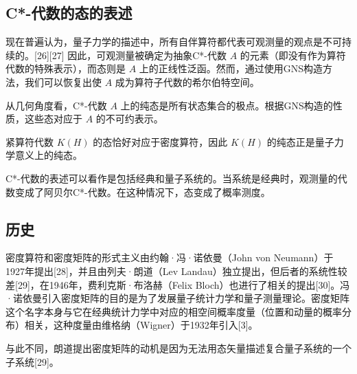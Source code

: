 \subsection{C*-代数的态的表述}
现在普遍认为，量子力学的描述中，所有自伴算符都代表可观测量的观点是不可持续的。[26][27] 因此，可观测量被确定为抽象C*-代数 \( A \) 的元素（即没有作为算符代数的特殊表示），而态则是 \( A \) 上的正线性泛函。然而，通过使用GNS构造方法，我们可以恢复出使 \( A \) 成为算符子代数的希尔伯特空间。

从几何角度看，C*-代数 \( A \) 上的纯态是所有状态集合的极点。根据GNS构造的性质，这些态对应于 \( A \) 的不可约表示。

紧算符代数 \( K(H) \) 的态恰好对应于密度算符，因此 \( K(H) \) 的纯态正是量子力学意义上的纯态。

C*-代数的表述可以看作是包括经典和量子系统的。当系统是经典时，观测量的代数变成了阿贝尔C*-代数。在这种情况下，态变成了概率测度。
\subsection{历史}
密度算符和密度矩阵的形式主义由约翰·冯·诺依曼（John von Neumann）于1927年提出[28]，并且由列夫·朗道（Lev Landau）独立提出，但后者的系统性较差[29]，在1946年，费利克斯·布洛赫（Felix Bloch）也进行了相关的提出[30]。冯·诺依曼引入密度矩阵的目的是为了发展量子统计力学和量子测量理论。密度矩阵这个名字本身与它在经典统计力学中对应的相空间概率度量（位置和动量的概率分布）相关，这种度量由维格纳（Wigner）于1932年引入[3]。

与此不同，朗道提出密度矩阵的动机是因为无法用态矢量描述复合量子系统的一个子系统[29]。